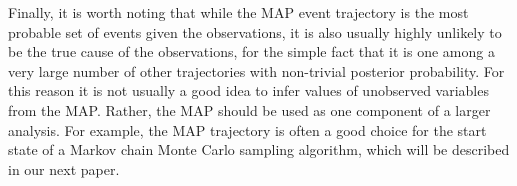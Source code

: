 \documentclass{article}
\begin{document}
Finally, it is worth noting that while the MAP event trajectory is the most probable set of events given the observations, it is also usually highly unlikely to be the true cause of the observations, for the simple fact that it is one among a very large number of other trajectories with non-trivial posterior probability. For this reason it is not usually a good idea to infer values of unobserved variables from the MAP. Rather, the MAP should be used as one component of a larger analysis. For example, the MAP trajectory is often a good choice for the start state of a Markov chain Monte Carlo sampling algorithm, which will be described in our next paper.

%
% 


\end{document}
